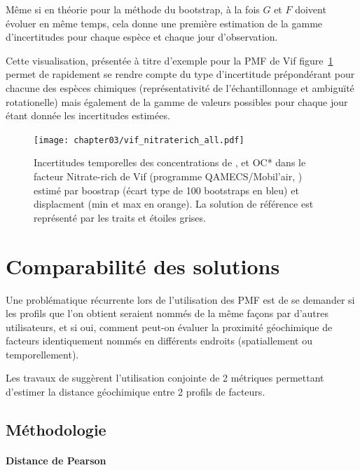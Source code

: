Même si en théorie pour la méthode du bootstrap, à la fois $G$ et $F$ doivent
évoluer en même temps, cela donne une première estimation de la gamme d'incertitudes pour
chaque espèce et chaque jour d'observation.

Cette visualisation, présentée à titre d'exemple pour la PMF de Vif
figure~\ref{fig:chapter03/vif_nitraterich_all} permet de rapidement se rendre compte du
type d'incertitude prépondérant pour chacune des espèces chimiques (représentativité de
l'échantillonnage et ambiguïté rotationelle) mais également de la gamme de valeurs
possibles pour chaque jour étant donnée les incertitudes estimées.

\begin{figure}[ht]
    \centering
    \texttt{[image: chapter03/vif\_nitraterich\_all.pdf]}
    \caption{Incertitudes temporelles des concentrations de \PMdix, \NOt et OC* dans le
        facteur Nitrate-rich de Vif (programme QAMECS/Mobil'air,
        \cite{borlazaFinescaleinprep.}) estimé par boostrap (écart type de 100 bootstraps en bleu)
        et displacment (min et max en orange). La solution de référence est représenté par les
    traits et étoiles grises.}%
    \label{fig:chapter03/vif_nitraterich_all}
\end{figure}


\section{Comparabilité des solutions}%
\label{sub:comparabilité_des_solutions}

Une problématique récurrente lors de l'utilisation des PMF est de se demander si les
profils que l'on obtient seraient nommés de la même façons par d'autres utilisateurs, et
si oui, comment peut-on évaluer la proximité géochimique de facteurs identiquement nommés
en différents endroits (spatiallement ou temporellement).

Les travaux de \cite{belisNew2015a} suggèrent l'utilisation conjointe de 2
métriques permettant d'estimer la distance géochimique entre 2 profils de facteurs.

\subsection{Méthodologie}%
\label{sub:méthodologie}

\paragraph{Distance de Pearson}%
\label{par:distance_de_pearson}

